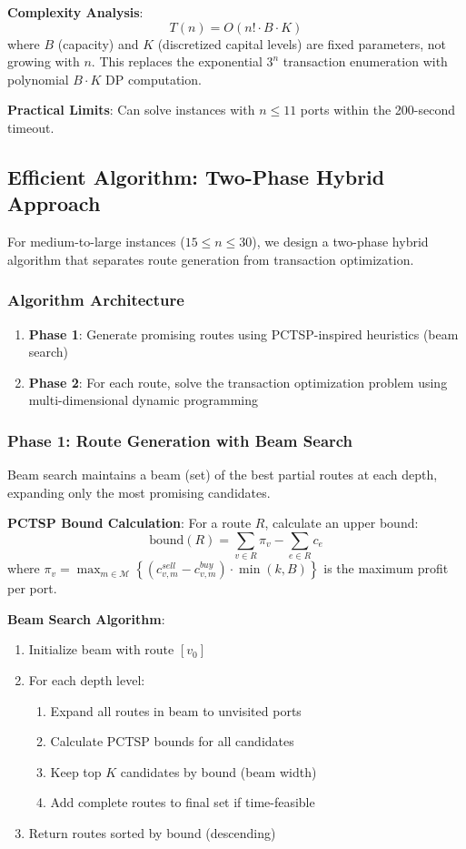 \documentclass[12pt]{article}
\begin{document}
\textbf{Complexity Analysis}: 
$$T(n) = O(n! \cdot B \cdot K)$$
where $B$ (capacity) and $K$ (discretized capital levels) are fixed parameters, not growing with $n$. This replaces the exponential $3^n$ transaction enumeration with polynomial $B \cdot K$ DP computation.

\textbf{Practical Limits}: Can solve instances with $n \leq 11$ ports within the 200-second timeout.

\subsection{Efficient Algorithm: Two-Phase Hybrid Approach}

For medium-to-large instances ($15 \leq n \leq 30$), we design a two-phase hybrid algorithm that separates route generation from transaction optimization.

\subsubsection{Algorithm Architecture}

\begin{enumerate}
    \item \textbf{Phase 1}: Generate promising routes using PCTSP-inspired heuristics (beam search)
    \item \textbf{Phase 2}: For each route, solve the transaction optimization problem using multi-dimensional dynamic programming
\end{enumerate}

\subsubsection{Phase 1: Route Generation with Beam Search}

Beam search maintains a beam (set) of the best partial routes at each depth, expanding only the most promising candidates.

\textbf{PCTSP Bound Calculation}: For a route $R$, calculate an upper bound:
$$\text{bound}(R) = \sum_{v \in R} \pi_v - \sum_{e \in R} c_e$$
where $\pi_v = \max_{m \in \mathcal{M}} \left\{ (c_{v,m}^{sell} - c_{v,m}^{buy}) \cdot \min(k, B) \right\}$ is the maximum profit per port.

\textbf{Beam Search Algorithm}:
\begin{enumerate}
    \item Initialize beam with route $[v_0]$
    \item For each depth level:
    \begin{enumerate}
        \item Expand all routes in beam to unvisited ports
        \item Calculate PCTSP bounds for all candidates
        \item Keep top $K$ candidates by bound (beam width)
        \item Add complete routes to final set if time-feasible
    \end{enumerate}
    \item Return routes sorted by bound (descending)
\end{enumerate}
\end{document}
